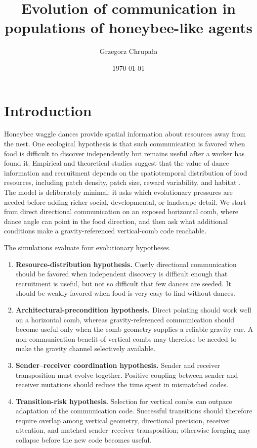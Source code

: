 \documentclass[11pt]{article}
\title{Evolution of communication in populations of honeybee-like agents}
\author{Grzegorz Chrupa{\l}a}
\date{\today}
\begin{document}
\maketitle

\section{Introduction}

Honeybee waggle dances provide spatial information about resources away from
the nest. One ecological hypothesis is that such communication is favored when
food is difficult to discover independently but remains useful after a worker
has found it. Empirical and theoretical studies suggest that the value of dance
information and recruitment depends on the spatiotemporal distribution of food
resources, including patch density, patch size, reward variability, and habitat
\cite{sherman_visscher_2002,dornhaus_chittka_2004,dornhaus_etal_2006,beekman_lew_2008,donaldson_matasci_dornhaus_2012,schurch_gruter_2014,price_gruter_2015}.
The model is deliberately minimal: it asks which evolutionary pressures are
needed before adding richer social, developmental, or landscape detail. We start
from direct directional communication on an exposed horizontal comb, where dance
angle can point in the food direction, and then ask what additional conditions
make a gravity-referenced vertical-comb code reachable.

The simulations evaluate four evolutionary hypotheses.
\begin{enumerate}
\item \textbf{Resource-distribution hypothesis.} Costly directional
communication should be favored when independent discovery is difficult enough
that recruitment is useful, but not so difficult that few dances are seeded.
It should be weakly favored when food is very easy to find without dances.
\item \textbf{Architectural-precondition hypothesis.} Direct pointing should
work well on a horizontal comb, whereas gravity-referenced communication should
become useful only when the comb geometry supplies a reliable gravity cue.
A non-communication benefit of vertical combs may therefore be needed to make
the gravity channel selectively available.
\item \textbf{Sender--receiver coordination hypothesis.} Sender and receiver
transposition must evolve together. Positive coupling between sender and
receiver mutations should reduce the time spent in mismatched codes.
\item \textbf{Transition-risk hypothesis.} Selection for vertical combs can
outpace adaptation of the communication code. Successful transitions should
therefore require overlap among vertical geometry, directional precision,
receiver attention, and matched sender--receiver transposition; otherwise
foraging may collapse before the new code becomes useful.
\end{enumerate}
\end{document}
